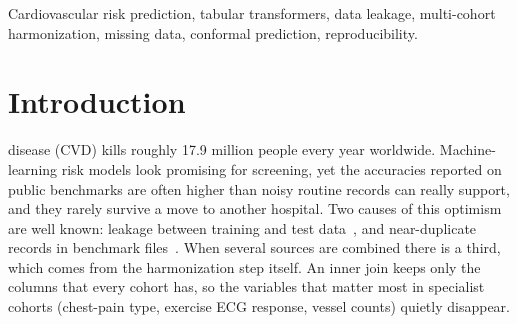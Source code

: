 \documentclass[conference]{IEEEtran}
\begin{document}
\begin{IEEEkeywords}
Cardiovascular risk prediction, tabular transformers, data leakage, multi-cohort harmonization, missing data, conformal prediction, reproducibility.
\end{IEEEkeywords}

\section{Introduction}
 disease (CVD) kills roughly 17.9 million people every year worldwide. Machine-learning risk models look promising for screening, yet the accuracies reported on public benchmarks are often higher than noisy routine records can really support, and they rarely survive a move to another hospital. Two causes of this optimism are well known: leakage between training and test data~\cite{kapoor2023}, and near-duplicate records in benchmark files~\cite{barz2020}. When several sources are combined there is a third, which comes from the harmonization step itself. An inner join keeps only the columns that every cohort has, so the variables that matter most in specialist cohorts (chest-pain type, exercise ECG response, vessel counts) quietly disappear.
\end{document}
